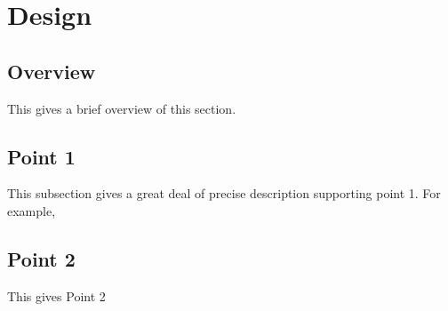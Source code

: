 \section{Design}
\label{sec:Design}

\subsection{Overview} 
This gives a brief overview of this section.

\subsection{Point 1}
This subsection gives a great deal of precise description supporting point 1.  For example,

\subsection{Point 2}
This gives Point 2
